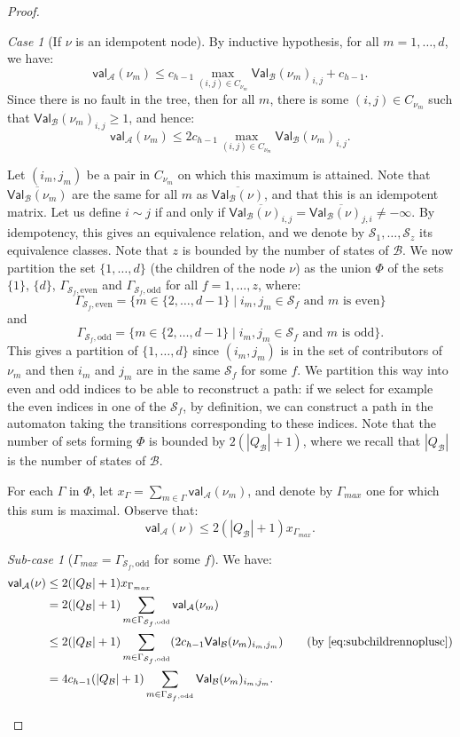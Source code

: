 \documentclass[10pt,a4paper]{amsart}
\theoremstyle{definition}
\numberwithin{equation}{section}
\theoremstyle{remark}
\newtheorem{case}{Case}
\newtheorem{subcase}{Sub-case}[case]
\newcommand{\autA}{\mathcal{A}}
\newcommand{\autB}{\mathcal{B}}
\newcommand{\aval}{\mathsf{val}_\autA}
\newcommand{\bval}{\mathsf{Val}_\autB}
\theoremstyle{remark}
\begin{document}
\begin{proof}
\begin{case}[If $\nu$ is an idempotent node]
By inductive hypothesis, for all $m=1,\ldots, d$, we have:
\[ \aval(\nu_m) \leq c_{h-1} \max_{(i,j) \in C_{\nu_m}} \bval(\nu_m)_{i,j} + c_{h-1}.\]
Since there is no fault in the tree, then for all $m$, there is some $(i,j) \in C_{\nu_m}$ such that  $\bval(\nu_m)_{i,j} \geq 1$, and hence:
\begin{equation}\label{eq:subchildrennoplusc} \aval(\nu_m) \leq 2c_{h-1} \max_{(i,j) \in C_{\nu_m}} \bval(\nu_m)_{i,j}.\end{equation}

Let $(i_m,j_m)$ be a pair in $C_{\nu_m}$ on which this maximum is attained. Note that $\overline{\bval(\nu_m)}$ are the same for all $m$ as $\overline{\bval(\nu)}$, and that this is an idempotent matrix. Let us define $i\sim j$ if and only if $\overline{\bval(\nu)_{i,j}} = \overline{\bval(\nu)_{j,i}} \neq -\infty$. By idempotency, this gives an equivalence relation, and we denote by $\mathcal{S}_1,\dots,\mathcal{S}_{z}$ its equivalence classes. Note that $z$ is bounded by the number of states of $\autB$.
We now partition the set $\{1,\ldots, d\}$ (the children of the node $\nu$) as the union $\Phi$ of the sets $\{1\}$, $\{d\}$, $\Gamma_{\mathcal{S}_f,\text{even}}$ and $\Gamma_{\mathcal{S}_f,\text{odd}}$ for all $f=1,\ldots,z$, where:
\[\Gamma_{\mathcal{S}_f,\text{even}} =  \{ m \in\{2,\dots, d-1\} \mid i_m,j_m\in \mathcal{S}_f \text{ and $m$ is even}\}\]
and
\[\Gamma_{\mathcal{S}_f,\text{odd}} =  \{ m \in\{2,\dots, d-1\} \mid i_m,j_m\in \mathcal{S}_f \text{ and $m$ is odd}\}.\]
This gives a partition of $\{1,\ldots, d\}$ since $(i_m,j_m)$ is in the set of contributors of $\nu_m$ and then $i_m$ and $j_m$ are in the same $\mathcal{S}_f$ for some $f$. We partition this way into even and odd indices to be able to reconstruct a path: if we select for example the even indices in one of the $\mathcal{S}_f$, by definition, we can construct a path in the automaton taking the transitions corresponding to these indices.
Note that the number of sets forming $\Phi$ is bounded by $2(|Q_\autB| + 1)$, where we recall that $|Q_\autB|$ is the number of states of $\autB$.

For each $\Gamma$ in $\Phi$, let $x_\Gamma = \sum_{m\in \Gamma} \aval(\nu_m)$, and denote by $\Gamma_{max}$ one for which this sum is maximal. Observe that:
\[\aval(\nu) \leq 2(|Q_\autB| + 1)x_{\Gamma_{max}}.\]

\begin{subcase}[$\Gamma_{max} = \Gamma_{\mathcal{S}_f,\text{odd}}$ for some $f$]
We have:
\begin{align*}
\aval(\nu) &\le 2(|Q_\autB| + 1)x_{\Gamma_{max}}
\\&= 2(|Q_\autB| + 1)\sum_{m\in \Gamma_{\mathcal{S}_f,\text{odd}}}\aval(\nu_m) 
\\&\le 2(|Q_\autB| + 1)\sum_{m\in \Gamma_{\mathcal{S}_f,\text{odd}}}(2c_{h-1} \bval(\nu_m)_{i_m,j_m})
\tag{by~\cref{eq:subchildrennoplusc}}
\\&= 4c_{h-1}(|Q_\autB| + 1)\sum_{m\in \Gamma_{\mathcal{S}_f,\text{odd}}}\bval(\nu_m)_{i_m,j_m}.
\end{align*}


\end{subcase}
\end{case}
\end{proof}
\end{document}
